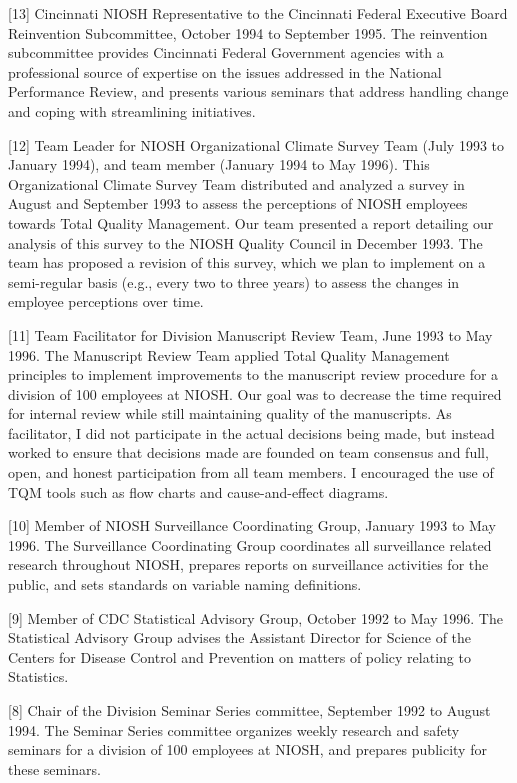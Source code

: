 \documentclass[
  12pt,
]{article}
\begin{document}
{[}13{]} Cincinnati NIOSH Representative to the Cincinnati Federal
Executive Board Reinvention Subcommittee, October 1994 to September
1995. The reinvention subcommittee provides Cincinnati Federal
Government agencies with a professional source of expertise on the
issues addressed in the National Performance Review, and presents
various seminars that address handling change and coping with
streamlining initiatives.

{[}12{]} Team Leader for NIOSH Organizational Climate Survey Team (July
1993 to January 1994), and team member (January 1994 to May 1996). This
Organizational Climate Survey Team distributed and analyzed a survey in
August and September 1993 to assess the perceptions of NIOSH employees
towards Total Quality Management. Our team presented a report detailing
our analysis of this survey to the NIOSH Quality Council in December
1993. The team has proposed a revision of this survey, which we plan to
implement on a semi-regular basis (e.g., every two to three years) to
assess the changes in employee perceptions over time.

{[}11{]} Team Facilitator for Division Manuscript Review Team, June 1993
to May 1996. The Manuscript Review Team applied Total Quality Management
principles to implement improvements to the manuscript review procedure
for a division of 100 employees at NIOSH. Our goal was to decrease the
time required for internal review while still maintaining quality of the
manuscripts. As facilitator, I did not participate in the actual
decisions being made, but instead worked to ensure that decisions made
are founded on team consensus and full, open, and honest participation
from all team members. I encouraged the use of TQM tools such as flow
charts and cause-and-effect diagrams.

{[}10{]} Member of NIOSH Surveillance Coordinating Group, January 1993
to May 1996. The Surveillance Coordinating Group coordinates all
surveillance related research throughout NIOSH, prepares reports on
surveillance activities for the public, and sets standards on variable
naming definitions.

{[}9{]} Member of CDC Statistical Advisory Group, October 1992 to May
1996. The Statistical Advisory Group advises the Assistant Director for
Science of the Centers for Disease Control and Prevention on matters of
policy relating to Statistics.

{[}8{]} Chair of the Division Seminar Series committee, September 1992
to August 1994. The Seminar Series committee organizes weekly research
and safety seminars for a division of 100 employees at NIOSH, and
prepares publicity for these seminars.
\end{document}
